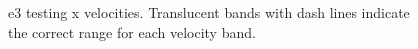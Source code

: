 \documentclass[
  letterpaper,
  DIV=11,
  numbers=noendperiod,
  oneside]{scrartcl}
\begin{document}
\begin{figure}


\caption{\label{fig-e3-test-vx}e3 testing x velocities. Translucent
bands with dash lines indicate the correct range for each velocity
band.}

\end{figure}%
\end{document}
